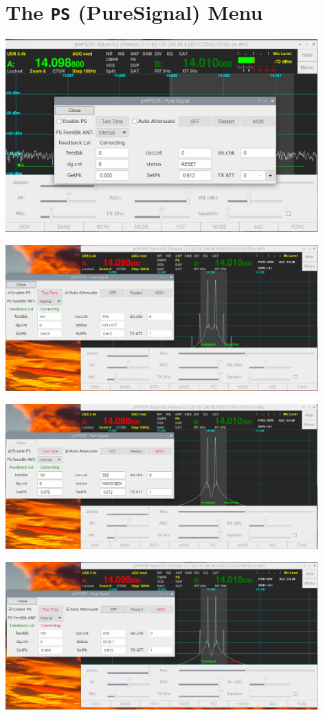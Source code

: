 \documentclass[12pt]{book}
\begin{document}
\section{The \texttt{PS} (PureSignal) Menu}
\begin{center}
\includegraphics[width=12cm]{PSMenu.png}
\end{center}
\begin{center}
\includegraphics[width=12cm]{PSnomon.png}
\end{center}
\begin{center}
\includegraphics[width=12cm]{PSmon.png}
\end{center}
\begin{center}
\includegraphics[width=12cm]{PSoff.png}
\end{center}
\end{document}
